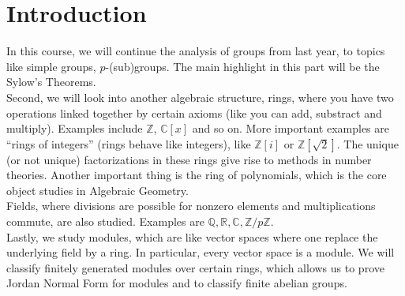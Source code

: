 \section{Introduction}
In this course, we will continue the analysis of groups from last year, to topics like simple groups, $p$-(sub)groups.
The main highlight in this part will be the Sylow's Theorems.\\
Second, we will look into another algebraic structure, rings, where you have two operations linked together by certain axioms (like you can add, substract and multiply).
Examples include $\mathbb Z$, $\mathbb C[x]$ and so on.
More important examples are ``rings of integers'' (rings behave like integers), like $\mathbb Z[i]$ or $\mathbb Z[\sqrt{2}]$.
The unique (or not unique) factorizations in these rings give rise to methods in number theories.
Another important thing is the ring of polynomials, which is the core object studies in Algebraic Geometry.\\
Fields, where divisions are possible for nonzero elements and multiplications commute, are also studied.
Examples are $\mathbb Q,\mathbb R,\mathbb C,\mathbb Z/p\mathbb Z$.\\
Lastly, we study modules, which are like vector spaces where one replace the underlying field by a ring.
In particular, every vector space is a module.
We will classify finitely generated modules over certain rings, which allows us to prove Jordan Normal Form for modules and to classify finite abelian groups.